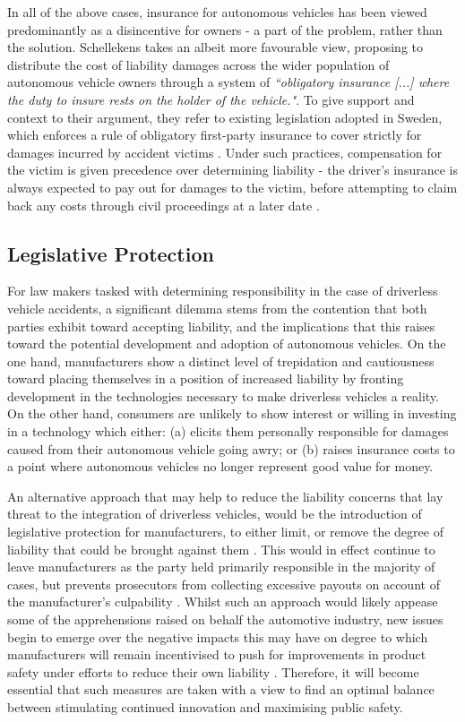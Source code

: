 \documentclass[conference]{IEEEtran}
\begin{document}
In all of the above cases, insurance for autonomous vehicles has been viewed predominantly as a disincentive for owners - a part of the problem, rather than the solution. Schellekens \cite{schellekens} takes an albeit more favourable view, proposing to distribute the cost of liability damages across the wider population of autonomous vehicle owners through a system of \textit{``obligatory insurance [...] where the duty to insure rests on the holder of the vehicle."}. To give support and context to their argument, they refer to existing legislation adopted in Sweden, which enforces a rule of obligatory first-party insurance to cover strictly for damages incurred by accident victims \cite{schellekens}. Under such practices, compensation for the victim is given precedence over determining liability \cite{schellekens} - the driver's insurance is always expected to pay out for damages to the victim, before attempting to claim back any costs through civil proceedings at a later date \cite{schellekens}.

\subsection{Legislative Protection}

For law makers tasked with determining responsibility in the case of driverless vehicle accidents, a significant dilemma stems from the contention that both parties exhibit toward accepting liability, and the implications that this raises toward the potential development and adoption of autonomous vehicles. On the one hand, manufacturers show a distinct level of trepidation and cautiousness toward placing themselves in a position of increased liability by fronting  development in the technologies necessary to make driverless vehicles a reality. On the other hand, consumers are unlikely to show interest or willing in investing in a technology which either: (a) elicits them personally responsible for damages caused from their autonomous vehicle going awry; or (b) raises insurance costs to a point where autonomous vehicles no longer represent good value for money.

An alternative approach that may help to reduce the liability concerns that lay threat to the integration of driverless vehicles, would be the introduction of legislative protection for manufacturers, to either limit, or remove the degree of liability that could be brought against them \cite{marchant}. This would in effect continue to leave manufacturers as the party held primarily responsible in the majority of cases, but prevents prosecutors from collecting excessive  payouts on account of the manufacturer's culpability \cite{marchant}. Whilst such an approach would likely appease some of the apprehensions raised on behalf the automotive industry, new issues begin to emerge over the negative 
	impacts this may have on degree to which manufacturers will remain incentivised to push for improvements in product safety under efforts to reduce their own liability \cite{marchant}. Therefore, it will become essential that such measures are taken with a view to find an optimal balance between stimulating continued innovation and maximising public safety. 
	
\end{document}
